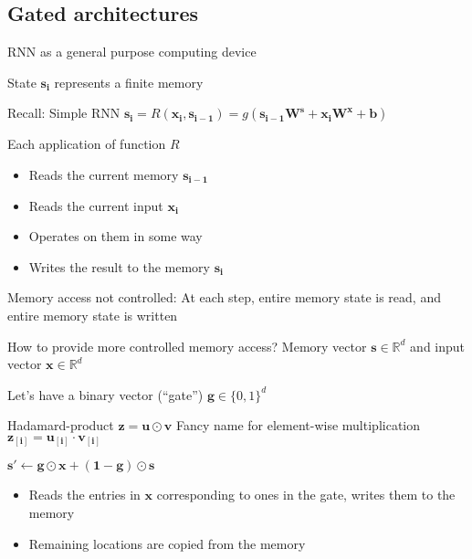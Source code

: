 \documentclass[12pt,aspectratio=169,handout]{beamer}
\begin{document}
\subsection{Gated architectures}

\begin{frame}{RNN as a general purpose computing device}

State $\bm{s_i}$ represents a finite memory

\begin{block}{Recall: Simple RNN}
$\bm{s_i} = R(\bm{x_i}, \bm{s_{i - 1}}) = g(\bm{s_{i-1}} \bm{W^s} + \bm{x_i} \bm{W^x} + \bm{b})$ 	
\end{block}
\pause
Each application of function $R$
\begin{itemize}
	\item Reads the current memory $\bm{s_{i-1}}$
	\item Reads the current input $\bm{x_i}$
	\item Operates on them in some way
	\item Writes the result to the memory $\bm{s_i}$
\end{itemize}
\pause Memory access not controlled: At each step, entire memory state is read, and entire memory state is written
\end{frame}

\begin{frame}{How to provide more controlled memory access?}
Memory vector $\bm{s} \in \mathbb{R}^d$ and input vector $\bm{x} \in \mathbb{R}^d$
\pause

Let's have a binary vector (``gate'') $\bm{g} \in \{0, 1\}^d$
\pause
\begin{block}{Hadamard-product $\bm{z} = \bm{u} \odot \bm{v}$}
Fancy name for element-wise multiplication
$\bm{z_{[i]}} = \bm{u_{[i]}} \cdot \bm{v_{[i]}}$
\end{block}
$
\bm{s'} \gets \bm{g} \odot \bm{x} + (\bm{1} - \bm{g}) \odot \bm{s}
$
\begin{itemize}
	\item \pause Reads the entries in $\bm{x}$ corresponding to ones in the gate, writes them to the memory
	\item \pause Remaining locations are copied from the memory
\end{itemize}

\end{frame}
\end{document}
